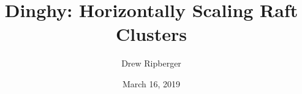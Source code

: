 \documentclass[11pt, twocolumn]{article}
\title{Dinghy: Horizontally Scaling Raft Clusters}
\author{Drew Ripberger}
\date{March 16, 2019}
\begin{document}
  \maketitle
  \textbf{}
  
  
  
  
  
  
  
  
  
\end{document}
